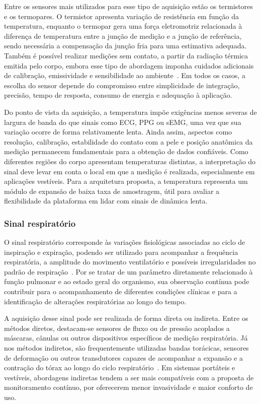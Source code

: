 \documentclass[a4paper,12pt]{fcte}
\begin{document}
Entre os sensores mais utilizados para esse tipo de aquisição estão os termistores e os termopares. O termistor apresenta variação de resistência em função da temperatura, enquanto o termopar gera uma força eletromotriz relacionada à diferença de temperatura entre a junção de medição e a junção de referência, sendo necessária a compensação da junção fria para uma estimativa adequada. Também é possível realizar medições sem contato, a partir da radiação térmica emitida pelo corpo, embora esse tipo de abordagem imponha cuidados adicionais de calibração, emissividade e sensibilidade ao ambiente~\cite{boano2011temperature}. Em todos os casos, a escolha do sensor depende do compromisso entre simplicidade de integração, precisão, tempo de resposta, consumo de energia e adequação à aplicação.

Do ponto de vista da aquisição, a temperatura impõe exigências menos severas de largura de banda do que sinais como ECG, PPG ou sEMG, uma vez que sua variação ocorre de forma relativamente lenta. Ainda assim, aspectos como resolução, calibração, estabilidade do contato com a pele e posição anatômica da medição permanecem fundamentais para a obtenção de dados confiáveis. Como diferentes regiões do corpo apresentam temperaturas distintas, a interpretação do sinal deve levar em conta o local em que a medição é realizada, especialmente em aplicações vestíveis. Para a arquitetura proposta, a temperatura representa um módulo de expansão de baixa taxa de amostragem, útil para avaliar a flexibilidade da plataforma em lidar com sinais de dinâmica lenta.

\subsubsection{Sinal respiratório}

O sinal respiratório corresponde às variações fisiológicas associadas ao ciclo de inspiração e expiração, podendo ser utilizado para acompanhar a frequência respiratória, a amplitude do movimento ventilatório e possíveis irregularidades no padrão de respiração~\cite{vitazkova2024resp}. Por se tratar de um parâmetro diretamente relacionado à função pulmonar e ao estado geral do organismo, sua observação contínua pode contribuir para o acompanhamento de diferentes condições clínicas e para a identificação de alterações respiratórias ao longo do tempo.

A aquisição desse sinal pode ser realizada de forma direta ou indireta. Entre os métodos diretos, destacam-se sensores de fluxo ou de pressão acoplados a máscaras, cânulas ou outros dispositivos específicos de medição respiratória. Já nos métodos indiretos, são frequentemente utilizadas bandas torácicas, sensores de deformação ou outros transdutores capazes de acompanhar a expansão e a contração do tórax ao longo do ciclo respiratório~\cite{vitazkova2024resp}. Em sistemas portáteis e vestíveis, abordagens indiretas tendem a ser mais compatíveis com a proposta de monitoramento contínuo, por oferecerem menor invasividade e maior conforto de uso.
\end{document}
